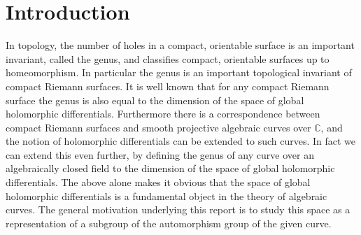 \section{Introduction}

In topology, the number of holes in a compact, orientable surface is an important invariant, called the genus, and classifies compact, orientable surfaces up to homeomorphism.
In particular the genus is an important topological invariant of compact Riemann surfaces.
It is well known that for any compact Riemann surface the genus is also equal to the dimension of the space of global holomorphic differentials.
Furthermore there is a correspondence between compact Riemann surfaces and smooth projective algebraic curves over $\mathbb C$, and the notion of holomorphic differentials can be extended to such curves.
In fact we can extend this even further, by defining the genus of any curve over an algebraically closed field to the dimension of the space of global holomorphic differentials.
The above alone makes it obvious that the space of global holomorphic differentials is a fundamental object in the theory of algebraic curves.
The general motivation underlying this report is to study this space as a representation of a subgroup of the automorphism group of the given curve.


